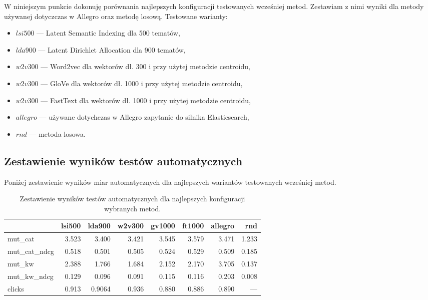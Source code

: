 \documentclass[pl]{minipw} %
\begin{document}
W niniejszym punkcie dokonuję porównania najlepszych konfiguracji testowanych wcześniej metod. Zestawiam z nimi wyniki dla metody używanej dotyczczas w Allegro oraz metodę losową.
Testowane warianty:
\begin{itemize}
	\item $lsi500$ --- Latent Semantic Indexing dla 500 tematów,
	\item $lda900$ --- Latent Dirichlet Allocation dla 900 tematów,
	\item $w2v300$ --- Word2vec dla wektorów dł. 300 i przy użytej metodzie centroidu,
	\item $w2v300$ --- GloVe dla wektorów dł. 1000 i przy użytej metodzie centroidu,
	\item $w2v300$ --- FastText dla wektorów dł. 1000 i przy użytej metodzie centroidu,
	\item $allegro$ --- używane dotychczas w Allegro zapytanie do silnika Elasticsearch,
	\item $rnd$ --- metoda losowa.
\end{itemize}
\subsection{Zestawienie wyników testów automatycznych}
Poniżej zestawienie wyników miar automatycznych dla najlepszych wariantów testowanych wcześniej metod.
\begin{table}[H]
	\centering
	\begin{tabular}{lrrrrrrr}
		\hline
		&   lsi500 &    lda900 &    w2v300 &   gv1000 &   ft1000 &   allegro &          rnd \\
		\hline
		mut\_cat      & 3.523  & 3.400   & 3.421   & 3.545  & 3.579  &  3.471  &   1.233    \\
		mut\_cat\_ndcg & 0.518 & 0.501  & 0.505  & 0.524 & 0.529 &  0.509 &   0.185    \\
		mut\_kw       & 2.388  & 1.766   & 1.684   & 2.152  & 2.170  &  3.705  &   0.137   \\
		mut\_kw\_ndcg  & 0.129 & 0.096 & 0.091 & 0.115 & 0.116 &  0.203 &   0.008 \\
		clicks       & 0.913 & 0.9064  & 0.936  & 0.880 & 0.886 &  0.890 & ---          \\
		\hline
	\end{tabular}
	\caption{Zestawienie wyników testów automatycznych dla najlepszych konfiguracji wybranych metod.}
\end{table}
\end{document}
